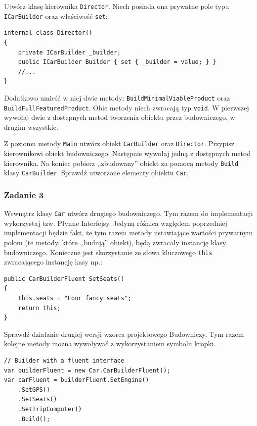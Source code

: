 Utwórz klasę kierownika \texttt{Director}. Niech posiada ona prywatne pole typu \texttt{ICarBuilder} oraz właściwość \texttt{set}:
\begin{lstlisting}
internal class Director()
{
	private ICarBuilder _builder;
	public ICarBuilder Builder { set { _builder = value; } }
	//...
}
\end{lstlisting}
Dodatkowo umieść w niej dwie metody: \texttt{BuildMinimalViableProduct} oraz \texttt{BuildFullFeaturedProduct}. Obie metody niech zwracają typ \texttt{void}. W pierwszej wywołaj dwie z dostępnych metod tworzenia obiektu przez budowniczego, w drugim wszystkie.

Z poziomu metody \texttt{Main} utwórz obiekt \texttt{CarBuilder} oraz \texttt{Director}. Przypisz kierownikowi obiekt budowniczego. Następnie wywołaj jedną z dostępnych metod kierownika. Na koniec pobierz ,,zbudowany'' obiekt za pomocą metody \texttt{Build} klasy \texttt{CarBuilder}. Sprawdź utworzone elementy obiektu \texttt{Car}.

\subsubsection{Zadanie 3}
Wewnątrz klasy \texttt{Car} utwórz drugiego budowniczego. Tym razem do implementacji wykorzystaj tzw. Płynne Interfejsy. Jedyną różnicą względem poprzedniej implementacji będzie fakt, że tym razem metody ustawiające wartości prywatnym polom (te metody, które ,,budują'' obiekt), będą zwracały instancję klasy budowniczego. Konieczne jest skorzystanie ze słowa kluczowego \texttt{this} zwracającego instancję kasy np.:
\begin{lstlisting}
public CarBuilderFluent SetSeats()
{
	this.seats = "Four fancy seats";
	return this;
}
\end{lstlisting}

Sprawdź działanie drugiej wersji wzorca projektowego Budowniczy. Tym razem kolejne metody można wywoływać z wykorzystaniem symbolu kropki.
\begin{lstlisting}
// Builder with a fluent interface
var builderFluent = new Car.CarBuilderFluent();
var carFluent = builderFluent.SetEngine()
	.SetGPS()
	.SetSeats()
	.SetTripComputer()
	.Build();
\end{lstlisting}